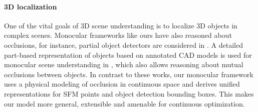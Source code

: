 

\vspace{-0.3cm}
\paragraph{3D localization}
One of the vital goals of 3D scene understanding is to localize 3D objects in complex scenes. 
Monocular frameworks like ours have also reasoned about occlusions, for instance, partial object detectors are considered in \cite{Wojek_etal_2013}. A detailed part-based representation of objects based on annotated CAD models is used for monocular scene understanding in \cite{Zia_etal_2013,Zia_etal_2014,Zia2015}, which also allows reasoning about mutual occlusions between objects. In contrast to these works, our monocular framework uses a physical modeling of occlusion in continuous space and derives unified representations for SFM points and object detection bounding boxes. This makes our model more general, extensible and amenable for continuous optimization.



